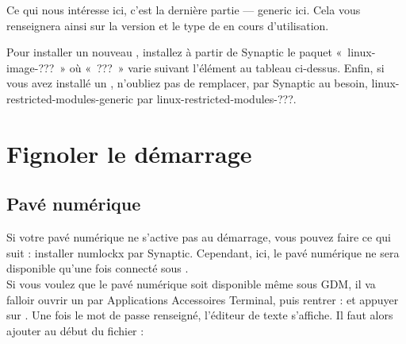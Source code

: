 Ce qui nous intéresse ici, c'est la dernière partie --- generic ici. Cela vous renseignera ainsi sur la version et le type de  en cours d'utilisation.\par
Pour installer un nouveau , installez à partir de Synaptic  le paquet «~linux-image-???~» où «~???~» varie suivant l'élément au tableau ci-dessus. Enfin, si vous avez installé un  , n'oubliez pas de remplacer, par Synaptic au besoin, linux-restricted-modules-generic par linux-restricted-modules-???.
\section{Fignoler le démarrage}
\subsection{Pavé numérique}
Si votre pavé numérique ne s'active pas au démarrage, vous pouvez faire ce qui suit : installer numlockx par Synaptic. Cependant, ici, le pavé numérique ne sera disponible qu'une fois connecté sous .\\
Si vous voulez que le pavé numérique soit disponible même sous GDM, il va falloir ouvrir un  par Applications \FlecheDroite Accessoires \FlecheDroite Terminal, puis rentrer :  et appuyer sur . Une fois le mot de passe renseigné, l'éditeur de texte s'affiche. Il faut alors ajouter au début du fichier :
